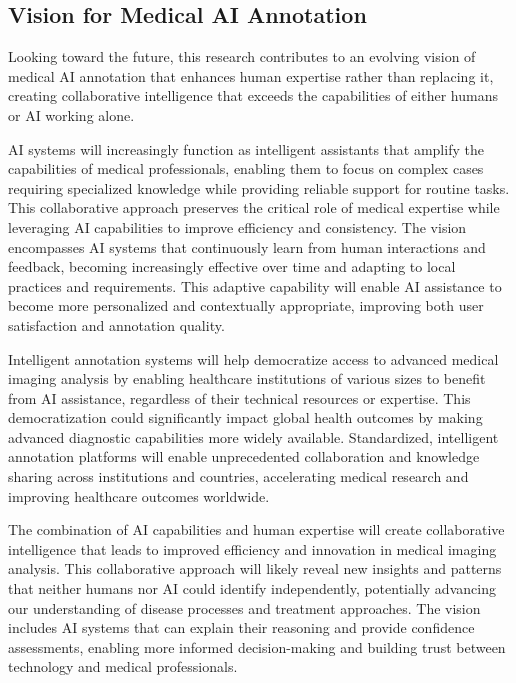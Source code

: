 \subsection{Vision for Medical AI Annotation}

Looking toward the future, this research contributes to an evolving vision of medical AI annotation that enhances human expertise rather than replacing it, creating collaborative intelligence that exceeds the capabilities of either humans or AI working alone.

AI systems will increasingly function as intelligent assistants that amplify the capabilities of medical professionals, enabling them to focus on complex cases requiring specialized knowledge while providing reliable support for routine tasks. This collaborative approach preserves the critical role of medical expertise while leveraging AI capabilities to improve efficiency and consistency. The vision encompasses AI systems that continuously learn from human interactions and feedback, becoming increasingly effective over time and adapting to local practices and requirements. This adaptive capability will enable AI assistance to become more personalized and contextually appropriate, improving both user satisfaction and annotation quality.

Intelligent annotation systems will help democratize access to advanced medical imaging analysis by enabling healthcare institutions of various sizes to benefit from AI assistance, regardless of their technical resources or expertise. This democratization could significantly impact global health outcomes by making advanced diagnostic capabilities more widely available. Standardized, intelligent annotation platforms will enable unprecedented collaboration and knowledge sharing across institutions and countries, accelerating medical research and improving healthcare outcomes worldwide.

The combination of AI capabilities and human expertise will create collaborative intelligence that leads to improved efficiency and innovation in medical imaging analysis. This collaborative approach will likely reveal new insights and patterns that neither humans nor AI could identify independently, potentially advancing our understanding of disease processes and treatment approaches. The vision includes AI systems that can explain their reasoning and provide confidence assessments, enabling more informed decision-making and building trust between technology and medical professionals.

